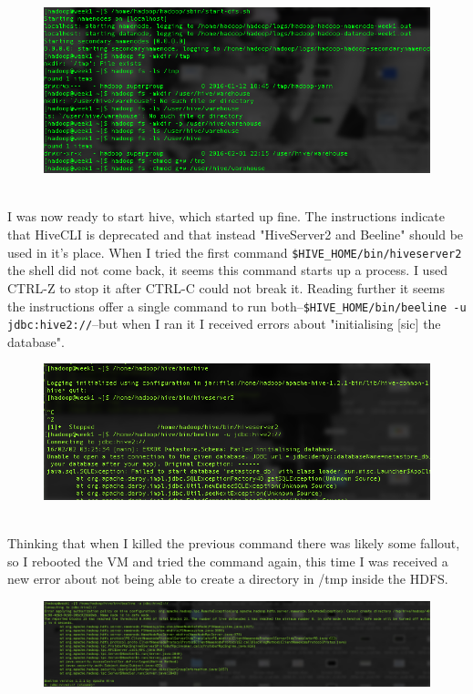 \documentclass[10pt]{article}
\begin{document}
\begin{figure}[!h]
\includegraphics[scale=0.37]{hdfs_create.png}
\centering
\end{figure}\\
\indent I was now ready to start hive, which started up fine. The instructions indicate that HiveCLI is deprecated and that instead "HiveServer2 and Beeline" should be used in it's place. When I tried the first command \verb|$HIVE_HOME/bin/hiveserver2| the shell did not come back, it seems this command starts up a process. I used CTRL-Z to stop it after CTRL-C could not break it. Reading further it seems the instructions offer a single command to run both--\verb|$HIVE_HOME/bin/beeline -u jdbc:hive2://|--but when I ran it I received errors about "initialising [sic] the database". 
\pagebreak
\begin{figure}[!h]
\includegraphics[scale=0.37]{cli_w_error.png}
\centering
\end{figure}\\
\indent Thinking that when I killed the previous command there was likely some fallout, so I rebooted the VM and tried the command again, this time I was received a new error about not being able to create a directory in /tmp inside the HDFS.
\begin{figure}[!h]
\includegraphics[scale=0.37]{cli_w_error2.png}
\centering
\end{figure}\\
\end{document}

